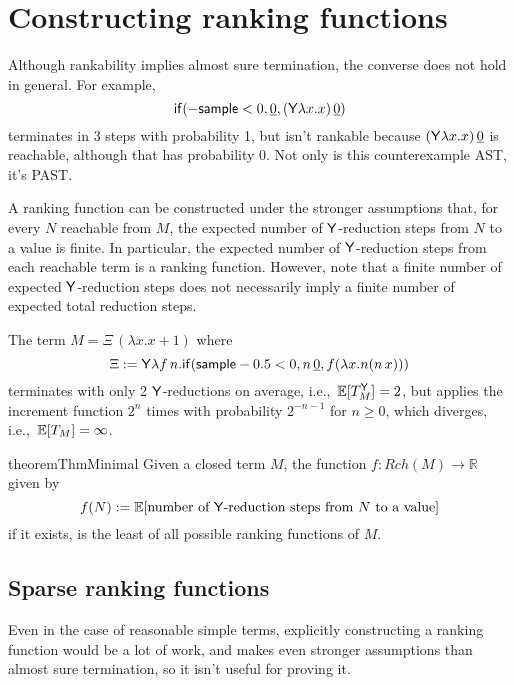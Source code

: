 \section{Constructing ranking functions}
\label{sec:ranking}

Although rankability implies almost sure termination, the converse does not hold in general. For example,
\begin{equation}
\tif{{-}\tsample < 0}{\underline{0}}{(\tY \lambda x. x) \, \underline 0}
\label{ex:0 probability reachable}
\end{equation}
terminates in 3 steps with probability 1, but isn't rankable because $(\mathsf{Y} \lambda x. x) \, \underline 0$ is reachable, although that has probability 0. 
Not only is this counterexample AST, it's PAST. %

A ranking function can be constructed under the stronger assumptions that, for every $N$ reachable from $M$, the expected number of $\mathsf{Y}$-reduction steps from $N$ to a value is finite. 
In particular, the expected number of $\mathsf{Y}$-reduction steps from each reachable term is a ranking function. 
However, note that a finite number of expected $\mathsf{Y}$-reduction steps does not necessarily imply a finite number of expected total reduction steps.

\begin{example}
\label{ex:tY finite does not imply t finite}
The term $M = \Xi \, (\lambda x. x+1)$ where
\[
\Xi := \mathsf{Y} \lambda f \, n. \mathsf{if}(\mathsf{sample} - 0.5 < 0, n \, \underline 0, f (\lambda x. n (n \, x)))
\] 
terminates with only 2 $\mathsf{Y}$-reductions on average, i.e.,~$\mathbb{E}[T_M^{\mathsf{Y}}] = 2$, but applies the increment function $2^n$ times with probability $2^{-n-1}$ for $n \geq 0$, which diverges, i.e.,~$\mathbb{E}[T_M] = \infty$.
\end{example}

\begin{restatable}{theorem}{ThmMinimal} \label{thm:minimal}
Given a closed term $M$, the function $f:Rch(M) \to \mathbb R$ given by 
\[
f(N) := \mathbb E [\text{number of }\mathsf{Y}\text{-reduction steps from }N\text{ to a value}]
\] 
if it exists, is the least of all possible ranking functions of $M$.
\end{restatable}

\subsection{Sparse ranking functions}
Even in the case of reasonable simple terms, explicitly constructing a ranking function would be a lot of work, and  makes even stronger assumptions than almost sure termination, so it isn't useful for proving it.

